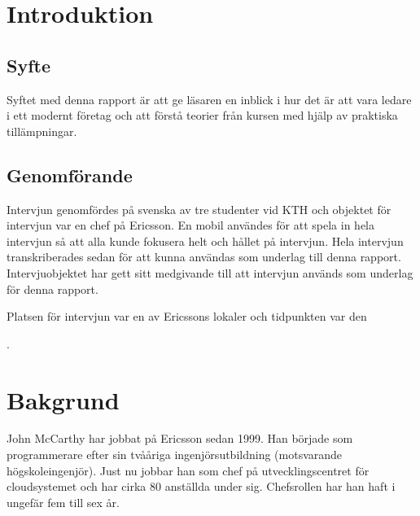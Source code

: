 \section{Introduktion}
\subsection{Syfte}
Syftet med denna rapport är att ge läsaren en inblick i hur det är att vara ledare i ett modernt företag och att förstå teorier från kursen med hjälp av praktiska tillämpningar.

\subsection{Genomförande}
Intervjun genomfördes på svenska av tre studenter vid KTH och objektet för intervjun var en chef på Ericsson. En mobil användes för att spela in hela intervjun så att alla kunde fokusera helt och hållet på intervjun. Hela intervjun transkriberades sedan för att kunna användas som underlag till denna rapport. Intervjuobjektet har gett sitt medgivande till att intervjun används som underlag för denna rapport.

Platsen för intervjun var en av Ericssons lokaler och tidpunkten var den \date{28 april, 2014}.

\section{Bakgrund}
\label{sec:bakgrund}

John McCarthy har jobbat på Ericsson sedan 1999. Han började som programmerare efter sin tvååriga ingenjörsutbildning (motsvarande högskoleingenjör). Just nu jobbar han som chef på utvecklingscentret för cloudsystemet och har cirka 80 anställda under sig. Chefsrollen har han haft i ungefär fem till sex år.